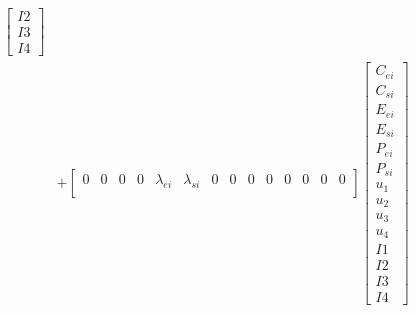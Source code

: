 \documentclass[11pt]{article} %
\begin{document}
\begin{align}
\begin{bmatrix}
        I2\\
        I3\\
        I4 
    \end{bmatrix}\nonumber\\
    &+
    \begin{bmatrix}
        0 & 0 & 0 & 0 & \lambda_{ei} & \lambda_{si} & 0 & 0 & 0 & 0 & 0 & 0 & 0 & 0\\
    \end{bmatrix} 
    \begin{bmatrix}
        C_{ei} \\
        C_{si} \\
        E_{ei} \\
        E_{si} \\
        P_{ei} \\
        P_{si} \\
        u_1\\
        u_2\\
        u_3\\
        u_4\\
        I1\\
        I2\\
        I3\\
        I4 
    \end{bmatrix}
\end{align}
\end{document}
